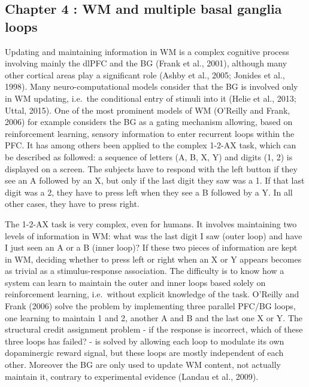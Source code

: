 \documentclass[
  11pt,
  a4paper,
]{scrbook}
\begin{document}
\subsection{Chapter 4 : WM and multiple basal ganglia
loops}\label{chapter-4-wm-and-multiple-basal-ganglia-loops}

Updating and maintaining information in WM is a complex cognitive
process involving mainly the dlPFC and the BG (Frank et al., 2001),
although many other cortical areas play a significant role (Ashby et
al., 2005; Jonides et al., 1998). Many neuro-computational models
consider that the BG is involved only in WM updating, i.e.~the
conditional entry of stimuli into it (Helie et al., 2013; Uttal, 2015).
One of the most prominent models of WM (O'Reilly and Frank, 2006) for
example considers the BG as a gating mechanism allowing, based on
reinforcement learning, sensory information to enter recurrent loops
within the PFC. It has among others been applied to the complex 1-2-AX
task, which can be described as followed: a sequence of letters (A, B,
X, Y) and digits (1, 2) is displayed on a screen. The subjects have to
respond with the left button if they see an A followed by an X, but only
if the last digit they saw was a 1. If that last digit was a 2, they
have to press left when they see a B followed by a Y. In all other
cases, they have to press right.

The 1-2-AX task is very complex, even for humans. It involves
maintaining two levels of information in WM: what was the last digit I
saw (outer loop) and have I just seen an A or a B (inner loop)? If these
two pieces of information are kept in WM, deciding whether to press left
or right when an X or Y appears becomes as trivial as a
stimulus-response association. The difficulty is to know how a system
can learn to maintain the outer and inner loops based solely on
reinforcement learning, i.e.~without explicit knowledge of the task.
O'Reilly and Frank (2006) solve the problem by implementing three
parallel PFC/BG loops, one learning to maintain 1 and 2, another A and B
and the last one X or Y. The structural credit assignment problem - if
the response is incorrect, which of these three loops has failed? - is
solved by allowing each loop to modulate its own dopaminergic reward
signal, but these loops are mostly independent of each other. Moreover
the BG are only used to update WM content, not actually maintain it,
contrary to experimental evidence (Landau et al., 2009).
\end{document}
